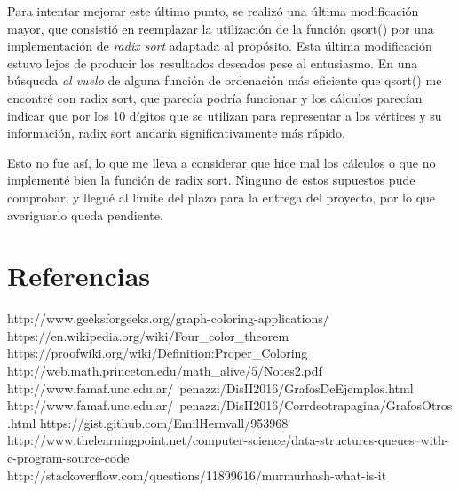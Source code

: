 \documentclass[11pt,a4paper]{article}
\theoremstyle{plain}
\begin{document}
Para intentar mejorar este último punto, se realizó una última modificación mayor, que consistió en reemplazar la utilización de la función qsort() por una implementación de \emph{radix sort} adaptada al propósito. Esta última modificación estuvo lejos de producir los resultados deseados pese al entusiasmo. En una búsqueda \emph{al vuelo} de alguna función de ordenación más eficiente que qsort() me encontré con radix sort, que parecía podría funcionar y los cálculos parecían indicar que por los 10 dígitos que se utilizan para representar a los vértices y su información, radix sort andaría significativamente más rápido.

Esto no fue así, lo que me lleva a considerar que hice mal los cálculos o que no implementé bien la función de radix sort. Ninguno de estos supuestos pude comprobar, y llegué al límite del plazo para la entrega del proyecto, por lo que averiguarlo queda pendiente.

\newpage
\section{Referencias}
\begin{thebibliography}{9}
	http://www.geeksforgeeks.org/graph-coloring-applications/
	https://en.wikipedia.org/wiki/Four\_color\_theorem
	https://proofwiki.org/wiki/Definition:Proper\_Coloring
 	http://web.math.princeton.edu/math\_alive/5/Notes2.pdf
    http://www.famaf.unc.edu.ar/~penazzi/DisII2016/GrafosDeEjemplos.html
    http://www.famaf.unc.edu.ar/~penazzi/DisII2016/Corrdeotrapagina/GrafosOtros.html
    https://gist.github.com/EmilHernvall/953968
    http://www.thelearningpoint.net/computer-science/data-structures-queues--with-c-program-source-code
 	http://stackoverflow.com/questions/11899616/murmurhash-what-is-it

\end{thebibliography}
\end{document}
